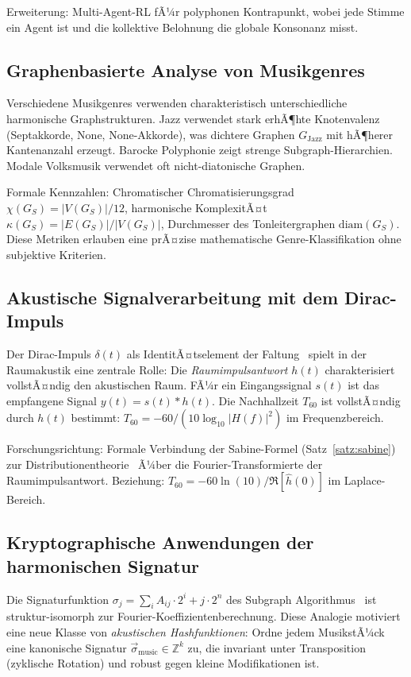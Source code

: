 ﻿\documentclass[a4paper,12pt]{article}
\theoremstyle{definition}
\begin{document}
Erweiterung: Multi-Agent-RL fÃ¼r polyphonen Kontrapunkt, wobei jede Stimme ein
Agent ist und die kollektive Belohnung die globale Konsonanz misst.

\subsection{Graphenbasierte Analyse von Musikgenres}

Verschiedene Musikgenres verwenden charakteristisch unterschiedliche harmonische
Graphstrukturen. Jazz verwendet stark erhÃ¶hte Knotenvalenz (Septakkorde, None,
None-Akkorde), was dichtere Graphen $G_{\mathrm{Jazz}}$ mit hÃ¶herer Kantenanzahl
erzeugt. Barocke Polyphonie zeigt strenge Subgraph-Hierarchien. Modale
Volksmusik verwendet oft nicht-diatonische Graphen.

Formale Kennzahlen: Chromatischer Chromatisierungsgrad $\chi(G_S) = |V(G_S)|/12$,
harmonische KomplexitÃ¤t $\kappa(G_S) = |E(G_S)|/|V(G_S)|$, Durchmesser des
Tonleitergraphen $\mathrm{diam}(G_S)$. Diese Metriken erlauben eine prÃ¤zise
mathematische Genre-Klassifikation ohne subjektive Kriterien.

\subsection{Akustische Signalverarbeitung mit dem Dirac-Impuls}

Der Dirac-Impuls $\delta(t)$ als IdentitÃ¤tselement der Faltung~\cite{epp2026dirac}
spielt in der Raumakustik eine zentrale Rolle: Die \emph{Raumimpulsantwort}
$h(t)$ charakterisiert vollstÃ¤ndig den akustischen Raum. FÃ¼r ein Eingangssignal
$s(t)$ ist das empfangene Signal $y(t) = s(t) * h(t)$. Die Nachhallzeit $T_{60}$
ist vollstÃ¤ndig durch $h(t)$ bestimmt: $T_{60} = -60/(10\log_{10}|H(f)|^2)$ im
Frequenzbereich.

Forschungsrichtung: Formale Verbindung der Sabine-Formel (Satz~\ref{satz:sabine})
zur Distributionentheorie~\cite{epp2026dirac} Ã¼ber die Fourier-Transformierte der
Raumimpulsantwort. Beziehung: $T_{60} = -60\ln(10) / \Re[\hat{h}(0)]$ im Laplace-Bereich.

\subsection{Kryptographische Anwendungen der harmonischen Signatur}

Die Signaturfunktion $\sigma_j = \sum_i A_{ij} \cdot 2^i + j \cdot 2^n$ des
Subgraph Algorithmus~\cite{epp2026subgraph} ist struktur-isomorph zur
Fourier-Koeffizientenberechnung. Diese Analogie motiviert eine neue
Klasse von \emph{akustischen Hashfunktionen}: Ordne jedem MusikstÃ¼ck
eine kanonische Signatur $\vec{\sigma}_{\mathrm{music}} \in \mathbb{Z}^k$ zu, die
invariant unter Transposition (zyklische Rotation) und robust gegen kleine
Modifikationen ist.
\end{document}
